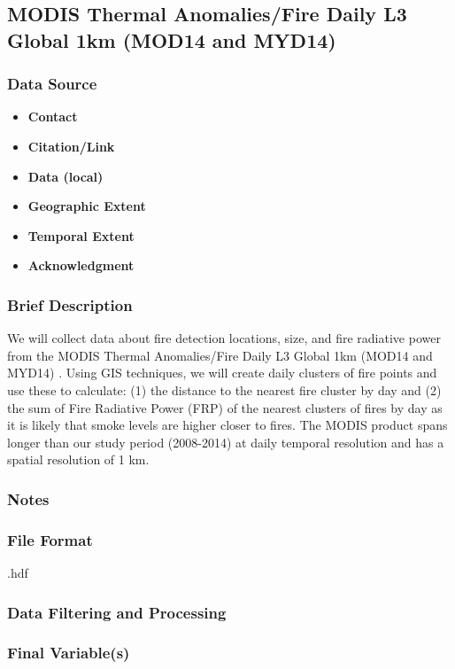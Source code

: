 \subsection{MODIS Thermal Anomalies/Fire Daily L3 Global 1km (MOD14 and MYD14)}
\subsubsection*{Data Source}
\begin{itemize}[nolistsep]
\item \textbf{Contact}
\item \textbf{Citation/Link}
\item \textbf{Data (local)}
\item \textbf{Geographic Extent}
\item \textbf{Temporal Extent}
\item \textbf{Acknowledgment}
\end{itemize}
\subsubsection*{Brief Description}

We will collect data about fire detection locations, size, and fire radiative power from the MODIS Thermal Anomalies/Fire Daily L3 Global 1km (MOD14 and MYD14) \citep{Giglio2006,Hawbaker2017}. 
Using GIS techniques, we will create daily clusters of fire points and use these to calculate: (1) the distance to the nearest fire cluster by day and (2) the sum of Fire Radiative Power (FRP) of the nearest clusters of fires by day as it is likely that smoke levels are higher closer to fires. The MODIS product spans longer than our study period (2008-2014) at daily temporal resolution and has a spatial resolution of 1 km.

\subsubsection*{Notes}
\subsubsection*{File Format} .hdf
\subsubsection*{Data Filtering and Processing}
\subsubsection*{Final Variable(s)}
